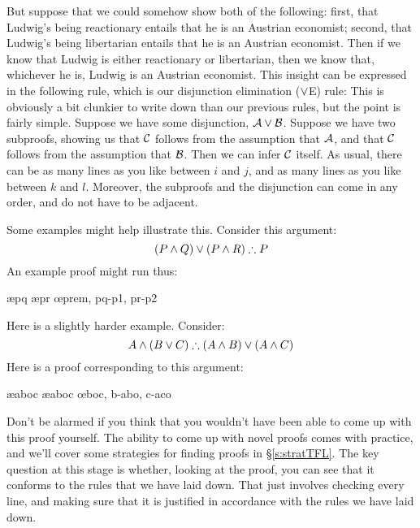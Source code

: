 But suppose that we could somehow show both of the following: first, that Ludwig's being reactionary entails that he is an Austrian economist; second, that Ludwig's being libertarian entails that he is an Austrian economist. Then if we know that Ludwig is either reactionary or libertarian, then we know that, whichever he is, Ludwig is an Austrian economist. This insight can be expressed in the following rule, which is our disjunction elimination ($\vee$E) rule:
This is obviously a bit clunkier to write down than our previous rules, but the point is fairly simple. Suppose we have some disjunction, $\mathcal{A} \vee \mathcal{B}$. Suppose we have two subproofs, showing us that $\mathcal{C}$ follows from the assumption that $\mathcal{A}$, and that $\mathcal{C}$ follows from the assumption that $\mathcal{B}$. Then we can infer $\mathcal{C}$ itself. As usual, there can be as many lines as you like between $i$ and $j$, and as many lines as you like between $k$ and $l$. Moreover, the subproofs and the disjunction can come in any order, and do not have to be adjacent.

Some examples might help illustrate this. Consider this argument:
$$(P \eand Q) \eor (P \eand R) \therefore P$$
An example proof might run thus:
	\begin{fitchproof}
			\open
				\ae{pq}
			\close
			\open
				\ae{pr}
			\close
		\oe{prem, pq-p1, pr-p2}
	\end{fitchproof}
Here is a slightly harder example. Consider:
	$$ A \eand (B \eor C) \therefore (A \eand B) \eor (A \eand C)$$
Here is a proof corresponding to this argument:
	\begin{fitchproof}
		\hypo{aboc}{A \eand (B \eor C)}
		\ae{aboc}
		\ae{aboc}
		\open
			\hypo{b}{B}
			\ai{a,b}
			\have{abo}{(A \eand B) \eor (A \eand C)}\oi{ab}
		\close
		\open
			\hypo{c}{C}
			\ai{a,c}
			\have{aco}{(A \eand B) \eor (A \eand C)}\oi{ac}
		\close
	\oe{boc, b-abo, c-aco}
	\end{fitchproof}
Don't be alarmed if you think that you wouldn't have been able to come up with this proof yourself. The ability to come up with novel proofs comes with practice, and we'll cover some strategies for finding proofs in \S\ref{s:stratTFL}. The key question at this stage is whether, looking at the proof, you can see that it conforms to the rules that we have laid down. That just involves checking every line, and making sure that it is justified in accordance with the rules we have laid down.



